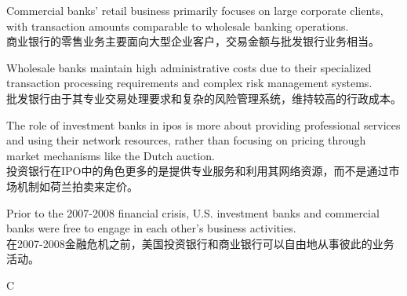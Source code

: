 \documentclass{article}
\begin{document}
\begin{choices}
    \item Commercial banks' retail business primarily focuses on large corporate clients, with transaction amounts comparable to wholesale banking operations.\\商业银行的零售业务主要面向大型企业客户，交易金额与批发银行业务相当。
    \item Wholesale banks maintain high administrative costs due to their specialized transaction processing requirements and complex risk management systems.\\批发银行由于其专业交易处理要求和复杂的风险管理系统，维持较高的行政成本。
    \item The role of investment banks in ipos is more about providing professional services and using their network resources, rather than focusing on pricing through market mechanisms like the Dutch auction.\\投资银行在IPO中的角色更多的是提供专业服务和利用其网络资源，而不是通过市场机制如荷兰拍卖来定价。
    \item Prior to the 2007-2008 financial crisis, U.S. investment banks and commercial banks were free to engage in each other's business activities.\\在2007-2008金融危机之前，美国投资银行和商业银行可以自由地从事彼此的业务活动。
\end{choices}





\begin{correctanswer}
    C
\end{correctanswer}
\end{document}

